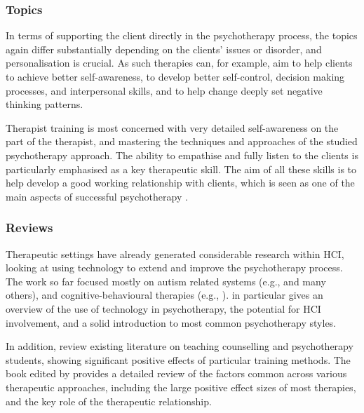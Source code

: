 \documentclass[prodmode,acmtochi]{acmsmall}
\newcommand{\todo}[1]{\textrm{\textrm{\textcolor{LightBlue}{[[#1]]} } } }
\begin{document}
\subsubsection*{Topics} 
In terms of supporting the client directly in the psychotherapy process, the topics again differ substantially depending on the clients' issues or disorder, and personalisation is crucial. As such therapies can, for example, aim to help clients to achieve better self-awareness, to develop better  self-control, decision making processes, and interpersonal skills, and to help change deeply set negative thinking patterns.  %

Therapist training is most concerned with very detailed self-awareness on the part of the therapist, and mastering the techniques and approaches of the studied psychotherapy approach. The ability to empathise and fully listen to the clients is particularly emphasised as a key therapeutic skill. The aim of all these skills is to help develop a good working relationship with clients, which is seen as one of the main aspects of successful psychotherapy \cite{Asay1999}.

\subsubsection*{Reviews}
Therapeutic settings have already generated considerable research within
HCI,  looking at using technology to extend and improve the psychotherapy process.
The work so far focused mostly on autism related systems (e.g.,
\cite{Escobedo2012,Picard2009,Hayes2011,Porayska-Pomsta2011,Hong2012} and many others), and cognitive-behavioural therapies (e.g., \cite{Coyle2011,Matthews2011}).  in particular gives an overview of the use of technology in psychotherapy, the potential for HCI involvement, and a solid introduction to most common psychotherapy styles.          

In addition,  review existing literature on teaching counselling and psychotherapy students, showing significant positive effects of particular training methods. The book edited by  provides a detailed review of the factors common across various therapeutic approaches, including the large positive effect sizes of most therapies, and the key role of the therapeutic relationship. 
\end{document}
